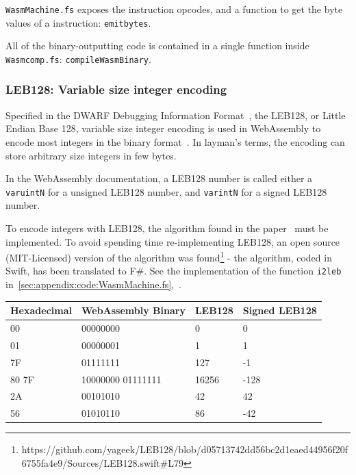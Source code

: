 \documentclass[a4paper]{article}
\begin{document}
\texttt{WasmMachine.fs} exposes the instruction opcodes, and a function to get the byte values of a instruction: \texttt{emitbytes}.

All of the binary-outputting code is contained in a single function inside \texttt{Wasmcomp.fs}: \texttt{compileWasmBinary}.

\subsubsection{LEB128: Variable size integer encoding}
Specified in the DWARF Debugging Information Format~\cite{DWARF}, the LEB128, or Little Endian Base 128, variable size integer encoding is used in WebAssembly to encode most integers in the binary format~\cite[\#numbers]{website:wasm-binary-encoding}. In layman's terms, the encoding can store arbitrary size integers in few bytes.

In the WebAssembly documentation, a LEB128 number is called either a \texttt{varuintN} for a unsigned LEB128 number, and \texttt{varintN} for a signed LEB128 number.

To encode integers with LEB128, the algorithm found in the paper~\cite{DWARF} must be implemented. To avoid spending time re-implementing LEB128, an open source (MIT-Licensed) version of the algorithm was found\footnote{https://github.com/yageek/LEB128/blob/d05713742dd56bc2d1eaed44956f20f6755fa4e9/Sources/LEB128.swift\#L79} - the algorithm, coded in Swift, has been translated to F\#. See the implementation of the function \texttt{i2leb} in~\ref{sec:appendix:code:WasmMachine.fs},~.

\begin{center}
    \begin{tabular}{| l | l | l | l |}
    \hline
    Hexadecimal & WebAssembly Binary & LEB128 & Signed LEB128 \\ \hline
    00    & 00000000 &     0 &    0 \\ \hline
    01    & 00000001 &     1 &    1 \\ \hline
    7F    & 01111111 &   127 &   -1 \\ \hline
    80 7F & 10000000 01111111 & 16256 & -128 \\ \hline
    2A    & 00101010 &    42 &   42 \\ \hline
    56    & 01010110 &    86 &  -42 \\ \hline
    \end{tabular}
\end{center}
\end{document}
